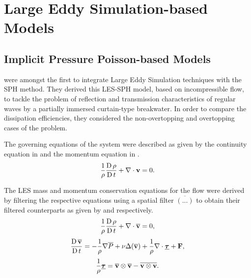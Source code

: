 \section{Large Eddy Simulation-based Models}
\label{sec:les-based-model}
\subsection{Implicit Pressure Poisson-based Models}
\label{sec:Implicit-Pressure-Poisson-based-Models}
\cite{Gotoh2004} were amongst the first to integrate Large Eddy Simulation techniques with the SPH method. They derived this LES-SPH model, based on incompressible flow, to tackle the problem of reflection and transmission characteristics of regular waves by a partially immersed curtain-type breakwater. In order to compare the dissipation efficiencies, they considered the non-overtopping and overtopping cases of the problem.

The governing equations of the system were described as given by the continuity equation in  and the momentum equation in .
\begin{equation}
    \frac{1}{\rho} \frac{\operatorname{D} \rho}{\operatorname{D} t} + \nabla \cdot \mathbf{v} = 0.
    \label{eq:Gotoh2004-continuity-governing}
\end{equation}

The LES mass and momentum conservation equations for the flow were derived by filtering the respective equations using a spatial filter $\overline{(...)}$ to obtain their filtered counterparts as given by  and  respectively.
\begin{equation}
    \frac{1}{\rho} \frac{\operatorname{D} \rho}{\operatorname{D} t} + \nabla \cdot \mathbf{\overline{v}} = 0,
    \label{eq:Gotoh2004-continuity-filtered}
\end{equation}
\begin{equation}
    \frac{\operatorname{D} \mathbf{\overline{v}}}{\operatorname{D} t} = -\frac{1}{\rho}\nabla \overline{P} + \nu \Delta ( \mathbf{\overline{v}} ) + \frac{1}{\rho}\nabla\cdot\underline{\bm{\tau}} + \mathbf{F},
    \label{eq:Gotoh2004-mom-filtered}
\end{equation}
\begin{equation}
    \frac{1}{\rho} \underline{\bm{\tau}} = \mathbf{\overline{v}} \otimes \mathbf{\overline{v}} - \overline{\mathbf{v} \otimes \mathbf{v}}.
    \label{eq:Gotoh2004-stress-tensor}
\end{equation}

